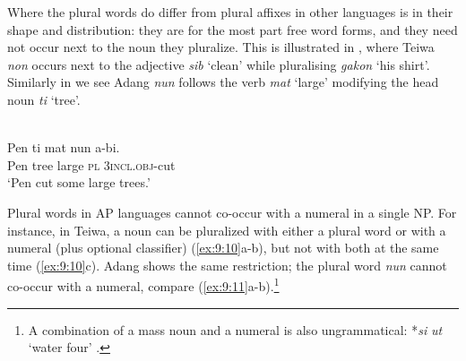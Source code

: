 




Where the plural words do differ from plural affixes in other languages is in their shape and distribution: they are for the most part free word forms, and they need not occur next to the noun they pluralize. This is illustrated in , where Teiwa \textit{non} occurs next to the adjective \textit{sib} `clean' while pluralising \textit{gakon} `his shirt'. Similarly in  we see Adang \textit{nun} follows the verb \textit{mat}\textit{{\textepsilon}} `large' modifying the head noun \textit{ti} `tree'.







\ea%
 \\
\label{ex:9:9}
\gll Pen ti {mat}{{\textepsilon}} nun {\textglotstop}a-b{{\textopeno}}{{\textglotstop}}{{\textopeno}}{i.} \\
   Pen tree large \textsc{pl} \textsc{3incl.obj}-cut \\
\glt `Pen cut some large trees.'
\z






Plural words in AP languages cannot co-occur with a numeral in a single NP. For instance, in Teiwa, a noun can be pluralized with either a plural word or with a numeral (plus optional classifier) (\ref{ex:9:10}a-b), but not with both at the same time (\ref{ex:9:10}c). Adang shows the same restriction; the plural word \textit{nun} cannot co-occur with a numeral, compare (\ref{ex:9:11}a-b).\footnote{A combination of a mass noun and a numeral is also ungrammatical: *\textit{s}\textit{{\textepsilon}}\textit{i} \textit{ut} `water four' \citep[296]{Haan2001}.}


